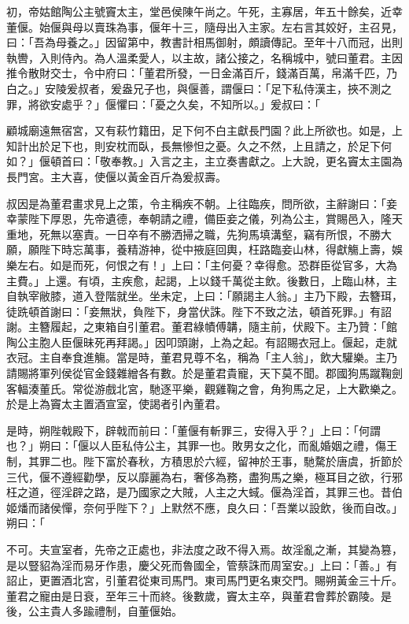 \begin{pinyinscope}
初，帝姑館陶公主號竇太主，堂邑侯陳午尚之。午死，主寡居，年五十餘矣，近幸董偃。始偃與母以賣珠為事，偃年十三，隨母出入主家。左右言其姣好，主召見，曰：「吾為母養之。」因留第中，教書計相馬御射，頗讀傳記。至年十八而冠，出則執轡，入則侍內。為人溫柔愛人，以主故，諸公接之，名稱城中，號曰董君。主因推令散財交士，令中府曰：「董君所發，一日金滿百斤，錢滿百萬，帛滿千匹，乃白之。」安陵爰叔者，爰盎兄子也，與偃善，謂偃曰：「足下私侍漢主，挾不測之罪，將欲安處乎？」偃懼曰：「憂之久矣，不知所以。」爰叔曰：「

顧城廟遠無宿宮，又有萩竹籍田，足下何不白主獻長門園？此上所欲也。如是，上知計出於足下也，則安枕而臥，長無慘怛之憂。久之不然，上且請之，於足下何如？」偃頓首曰：「敬奉教。」入言之主，主立奏書獻之。上大說，更名竇太主園為長門宮。主大喜，使偃以黃金百斤為爰叔壽。

叔因是為董君畫求見上之策，令主稱疾不朝。上往臨疾，問所欲，主辭謝曰：「妾幸蒙陛下厚恩，先帝遺德，奉朝請之禮，備臣妾之儀，列為公主，賞賜邑入，隆天重地，死無以塞責。一日卒有不勝洒掃之職，先狗馬填溝壑，竊有所恨，不勝大願，願陛下時忘萬事，養精游神，從中掖庭回輿，枉路臨妾山林，得獻觴上壽，娛樂左右。如是而死，何恨之有！」上曰：「主何憂？幸得愈。恐群臣從官多，大為主費。」上還。有頃，主疾愈，起謁，上以錢千萬從主飲。後數日，上臨山林，主自執宰敝膝，道入登階就坐。坐未定，上曰：「願謁主人翁。」主乃下殿，去簪珥，徒跣頓首謝曰：「妾無狀，負陛下，身當伏誅。陛下不致之法，頓首死罪。」有詔謝。主簪履起，之東箱自引董君。董君綠幘傅韝，隨主前，伏殿下。主乃贊：「館陶公主胞人臣偃昧死再拜謁。」因叩頭謝，上為之起。有詔賜衣冠上。偃起，走就衣冠。主自奉食進觴。當是時，董君見尊不名，稱為「主人翁」，飲大驩樂。主乃請賜將軍列侯從官金錢雜繒各有數。於是董君貴寵，天下莫不聞。郡國狗馬蹴鞠劍客輻湊董氏。常從游戲北宮，馳逐平樂，觀雞鞠之會，角狗馬之足，上大歡樂之。於是上為竇太主置酒宣室，使謁者引內董君。

是時，朔陛戟殿下，辟戟而前曰：「董偃有斬罪三，安得入乎？」上曰：「何謂也？」朔曰：「偃以人臣私侍公主，其罪一也。敗男女之化，而亂婚姻之禮，傷王制，其罪二也。陛下富於春秋，方積思於六經，留神於王事，馳騖於唐虞，折節於三代，偃不遵經勸學，反以靡麗為右，奢侈為務，盡狗馬之樂，極耳目之欲，行邪枉之道，徑淫辟之路，是乃國家之大賊，人主之大蜮。偃為淫首，其罪三也。昔伯姬燔而諸侯憚，奈何乎陛下？」上默然不應，良久曰：「吾業以設飲，後而自改。」朔曰：「

不可。夫宣室者，先帝之正處也，非法度之政不得入焉。故淫亂之漸，其變為篡，是以豎貂為淫而易牙作患，慶父死而魯國全，管蔡誅而周室安。」上曰：「善。」有詔止，更置酒北宮，引董君從東司馬門。東司馬門更名東交門。賜朔黃金三十斤。董君之寵由是日衰，至年三十而終。後數歲，竇太主卒，與董君會葬於霸陵。是後，公主貴人多踰禮制，自董偃始。


\end{pinyinscope}
